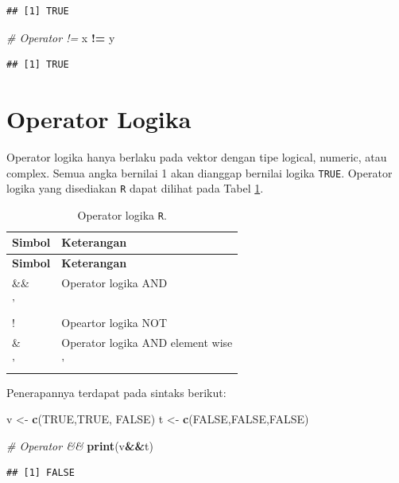 \documentclass[]{book}
\newenvironment{Shaded}{\begin{snugshade}}{\end{snugshade}}
\newcommand{\KeywordTok}[1]{\textcolor[rgb]{0.13,0.29,0.53}{\textbf{#1}}}
\newcommand{\StringTok}[1]{\textcolor[rgb]{0.31,0.60,0.02}{#1}}
\newcommand{\CommentTok}[1]{\textcolor[rgb]{0.56,0.35,0.01}{\textit{#1}}}
\newcommand{\OtherTok}[1]{\textcolor[rgb]{0.56,0.35,0.01}{#1}}
\newcommand{\OperatorTok}[1]{\textcolor[rgb]{0.81,0.36,0.00}{\textbf{#1}}}
\newcommand{\NormalTok}[1]{#1}
\begin{document}
\begin{verbatim}
## [1] TRUE
\end{verbatim}

\begin{Shaded}
\begin{Highlighting}[]
\CommentTok{# Operator !=}
\NormalTok{x }\OperatorTok{!=}\StringTok{ }\NormalTok{y}
\end{Highlighting}
\end{Shaded}

\begin{verbatim}
## [1] TRUE
\end{verbatim}

\section{Operator Logika}\label{operator-logika}

Operator logika hanya berlaku pada vektor dengan tipe logical, numeric,
atau complex. Semua angka bernilai 1 akan dianggap bernilai logika
\texttt{TRUE}. Operator logika yang disediakan \texttt{R} dapat dilihat
pada Tabel \ref{tab:oplogika}.

\begin{longtable}[]{@{}ll@{}}
\caption{\label{tab:oplogika} Operator logika \texttt{R}.}\tabularnewline
\toprule
\textbf{Simbol} & \textbf{Keterangan}\tabularnewline
\midrule
\endfirsthead
\toprule
\textbf{Simbol} & \textbf{Keterangan}\tabularnewline
\midrule
\endhead
\&\& & Operator logika AND\tabularnewline
' &\tabularnewline
! & Opeartor logika NOT\tabularnewline
\& & Operator logika AND element wise\tabularnewline
' & '\tabularnewline
\bottomrule
\end{longtable}

Penerapannya terdapat pada sintaks berikut:

\begin{Shaded}
\begin{Highlighting}[]
\NormalTok{v <-}\StringTok{ }\KeywordTok{c}\NormalTok{(}\OtherTok{TRUE}\NormalTok{,}\OtherTok{TRUE}\NormalTok{, }\OtherTok{FALSE}\NormalTok{)}
\NormalTok{t <-}\StringTok{ }\KeywordTok{c}\NormalTok{(}\OtherTok{FALSE}\NormalTok{,}\OtherTok{FALSE}\NormalTok{,}\OtherTok{FALSE}\NormalTok{)}

\CommentTok{# Operator &&}
\KeywordTok{print}\NormalTok{(v}\OperatorTok{&&}\NormalTok{t)}
\end{Highlighting}
\end{Shaded}

\begin{verbatim}
## [1] FALSE
\end{verbatim}
\end{document}
